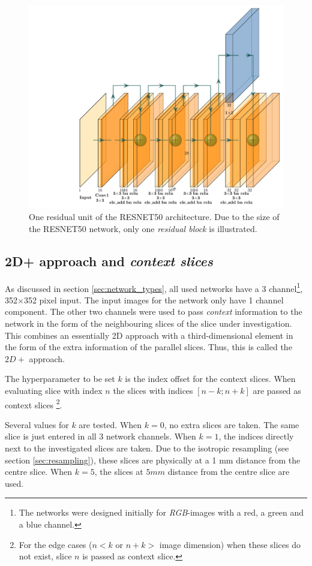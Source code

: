 \begin{figure}
\begin{minipage}{.99\textwidth}
        \includegraphics[width=.7\textwidth]{images/RESNET.pdf}
    \end{minipage}
    \caption{
One residual unit of the RESNET50 architecture.
    Due to the size of the RESNET50 network, only one \textit{residual block} is illustrated.
    }
\end{figure}


\subsection{2D+ approach and \textit{context slices}\label{section:twoDplus}}

As discussed in section \ref{sec:network_types}, all used networks have a 3 channel\footnote{The networks were designed initially for \textit{RGB}-images with a red, a green and a blue channel.}, 
352$\times$352 pixel input. 
The input images for the network only have 1 channel component. 
The other two channels were used to pass \textit{context} information to the network in the form of the neighbouring slices of the slice under investigation.
This combines an essentially 2D approach with a third-dimensional element in the form of the extra information of the parallel slices. Thus, this is called the $2D+$ approach.

The hyperparameter to be set $k$ is the index offset for the context slices.
When evaluating slice with index $n$ the slices with indices $\left[n-k; n+k\right]$ are passed as context slices
\footnote{For the edge cases ($n<k$ or $n+k>$ image dimension) when these slices do not exist, slice $n$ is passed as context slice.}.

Several values for $k$ are tested. When $k=0$, no extra slices are taken. The same slice is just entered in all 3 network channels. When $k=1$, the indices directly next to the investigated slices are taken.
Due to the isotropic resampling (see section \ref{sec:resampling}), these slices are physically at a 1 mm distance from the centre slice. When $k=5$, the slices at $5 mm$ distance from the centre slice are used.

